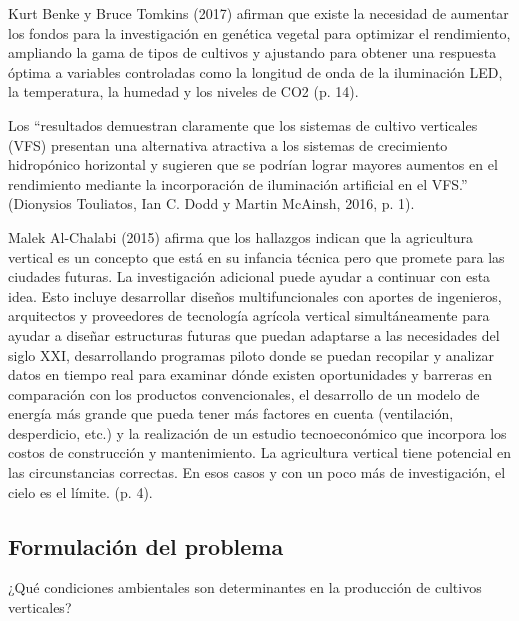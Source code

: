 \documentclass{report}
\begin{document}
Kurt Benke y Bruce Tomkins (2017) afirman que existe la necesidad de aumentar
los fondos para la investigación en genética vegetal para optimizar el
rendimiento, ampliando la gama de tipos de cultivos y ajustando para obtener una
respuesta óptima a variables controladas como la longitud de onda de la
iluminación LED, la temperatura, la humedad y los niveles de CO2 (p. 14).

Los ``resultados demuestran claramente que los sistemas de cultivo
verticales (VFS) presentan una alternativa atractiva a los sistemas de
crecimiento hidropónico horizontal y sugieren que se podrían lograr mayores
aumentos en el rendimiento mediante la incorporación de iluminación artificial
en el VFS.'' (Dionysios Touliatos, Ian C. Dodd y Martin McAinsh, 2016, p. 1).

Malek Al-Chalabi (2015) afirma que los hallazgos indican que la agricultura
vertical es un concepto que está en su infancia técnica pero que promete para
las ciudades futuras. La investigación adicional puede ayudar a continuar con
esta idea. Esto incluye desarrollar diseños multifuncionales con aportes de
ingenieros, arquitectos y proveedores de tecnología agrícola vertical
simultáneamente para ayudar a diseñar estructuras futuras que puedan adaptarse a
las necesidades del siglo XXI, desarrollando programas piloto donde se puedan
recopilar y analizar datos en tiempo real para examinar dónde existen
oportunidades y barreras en comparación con los productos convencionales, el
desarrollo de un modelo de energía más grande que pueda tener más factores en
cuenta (ventilación, desperdicio, etc.) y la realización de un estudio
tecnoeconómico que incorpora los costos de construcción y mantenimiento.
La agricultura vertical tiene potencial en las circunstancias correctas. En esos
casos y con un poco más de investigación, el cielo es el límite. (p. 4).
\subsection{Formulación del problema}

¿Qué condiciones ambientales son determinantes en la producción de
cultivos verticales?
\end{document}
